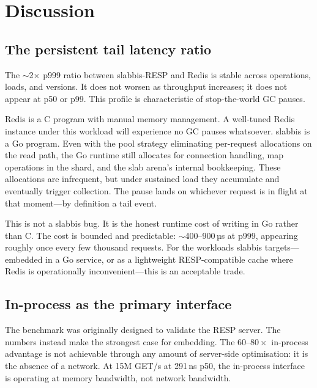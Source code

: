 \documentclass[a4paper,11pt]{article}
\begin{document}
\section{Discussion}

\subsection{The persistent tail latency ratio}
\label{sec:gc}

The $\sim$2$\times$ p999 ratio between slabbis-RESP and Redis is stable across
operations, loads, and versions. It does not worsen as throughput increases; it
does not appear at p50 or p99. This profile is characteristic of stop-the-world
GC pauses.

Redis is a C program with manual memory management. A well-tuned Redis instance
under this workload will experience no GC pauses whatsoever. slabbis is a Go
program. Even with the pool strategy eliminating per-request allocations on the
read path, the Go runtime still allocates for connection handling, map
operations in the shard, and the slab arena's internal bookkeeping. These
allocations are infrequent, but under sustained load they accumulate and
eventually trigger collection. The pause lands on whichever request is in flight
at that moment---by definition a tail event.

This is not a slabbis bug. It is the honest runtime cost of writing in Go
rather than C. The cost is bounded and predictable: $\sim$400--900\,µs at
p999, appearing roughly once every few thousand requests. For the workloads
slabbis targets---embedded in a Go service, or as a lightweight RESP-compatible
cache where Redis is operationally inconvenient---this is an acceptable trade.

\subsection{In-process as the primary interface}

The benchmark was originally designed to validate the RESP server. The numbers
instead make the strongest case for embedding. The $60\text{--}80\times$
in-process advantage is not achievable through any amount of server-side
optimisation: it is the absence of a network. At 15M GET/s at 291\,ns p50, the
in-process interface is operating at memory bandwidth, not network bandwidth.
\end{document}
